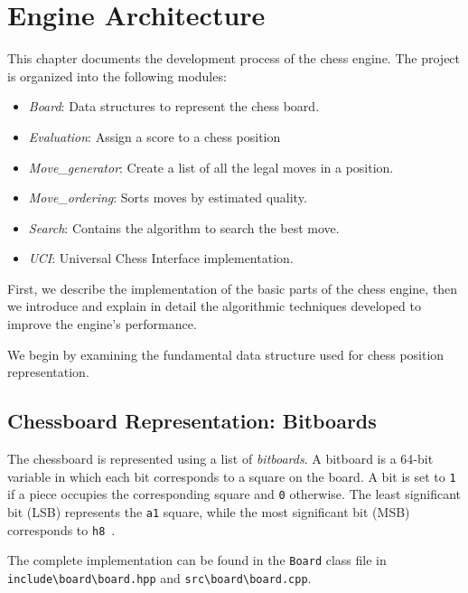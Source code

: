 \chapter{Engine Architecture}\label{cap:descripcionTrabajo}

This chapter documents the development process of the chess engine. The project is organized into the following modules:

\begin{itemize}[itemsep=1pt]
    \item \textit{Board}: Data structures to represent the chess board.
    \item \textit{Evaluation}: Assign a score to a chess position
    \item \textit{Move\_generator}: Create a list of all the legal moves in a position.
    \item \textit{Move\_ordering}: Sorts moves by estimated quality.
    \item \textit{Search}: Contains the algorithm to search the best move.
    \item \textit{UCI}: Universal Chess Interface implementation.
\end{itemize}

\noindent First, we describe the implementation of the basic parts of the chess engine, then we introduce and explain in detail the algorithmic techniques developed to improve the engine's performance.

\vspace{1em}

\noindent We begin by examining the fundamental data structure used for chess position representation.

\section{Chessboard Representation: Bitboards}

\noindent The chessboard is represented using a list of \textit{bitboards}. A bitboard is a 64-bit variable in which each bit corresponds to a square on the board. A bit is set to \texttt{1} if a piece occupies the corresponding square and \texttt{0} otherwise. The least significant bit (LSB) represents the \texttt{a1} square, while the most significant bit (MSB) corresponds to \texttt{h8}~\cite{Bitboards}.
 
\vspace{1em}

\noindent \parbox{\textwidth}{The complete implementation can be found in the \texttt{Board} class file in \texttt{include\textbackslash{}board\textbackslash{}board.hpp} and \texttt{src\textbackslash{}board\textbackslash{}board.cpp}.}

